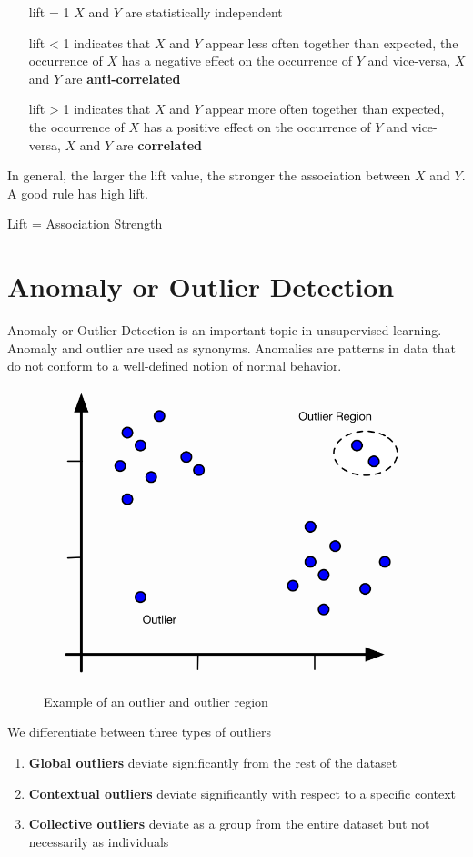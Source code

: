 \documentclass[11pt]{article}
\begin{document}
\begin{itemize}[leftmargin=*, labelindent=3cm, labelsep=1cm]
    \item[lift = 1] $X$ and $Y$ are statistically independent
    \item[lift < 1] indicates that $X$ and $Y$ appear less often together than expected, the occurrence of $X$ has a negative effect on the occurrence of $Y$ and vice-versa, $X$ and $Y$ are \textbf{anti-correlated}
    \item[lift > 1] indicates that $X$ and $Y$ appear more often together than expected, the occurrence of $X$ has a positive effect on the occurrence of $Y$ and vice-versa, $X$ and $Y$ are \textbf{correlated}
\end{itemize}

In general, the larger the lift value, the stronger the association between $X$ and $Y$. A good rule has high lift.

\begin{theorem}
    Lift = Association Strength
\end{theorem}

\section{Anomaly or Outlier Detection}

Anomaly or Outlier Detection is an important topic in unsupervised learning. Anomaly and outlier are used as synonyms. Anomalies are patterns in data that do not conform to a well-defined notion of normal behavior.

\begin{figure}[tbh!]
    \centering
    \includegraphics[width=0.4\linewidth, keepaspectratio]{Pictures/outlier_examples}
    \caption{Example of an outlier and outlier region}
    \label{fig:outlierexamples}
\end{figure}

We differentiate between three types of outliers

\begin{enumerate}
    \item \textbf{Global outliers} deviate significantly from the rest of the dataset
    \item \textbf{Contextual outliers} deviate significantly with respect to a specific context
    \item \textbf{Collective outliers} deviate as a group from the entire dataset but not necessarily as individuals
\end{enumerate}
\end{document}
